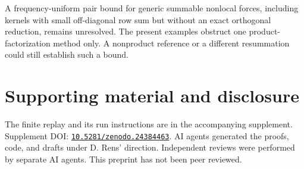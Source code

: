 \documentclass[11pt]{article}
\newcommand{\DOI}[1]{\href{https://doi.org/#1}{\nolinkurl{#1}}}
\begin{document}
A frequency-uniform pair bound for generic summable nonlocal forces, including kernels with small off-diagonal row sum but without an exact orthogonal reduction, remains unresolved. The present examples obstruct one product-factorization method only. A nonproduct reference or a different resummation could still establish such a bound.

\section*{Supporting material and disclosure}
The finite replay and its run instructions are in the accompanying supplement. Supplement DOI: \DOI{10.5281/zenodo.24384463}. AI agents generated the proofs, code, and drafts under D. Rens' direction. Independent reviews were performed by separate AI agents. This preprint has not been peer reviewed.

{\raggedright\small\par}
\end{document}
